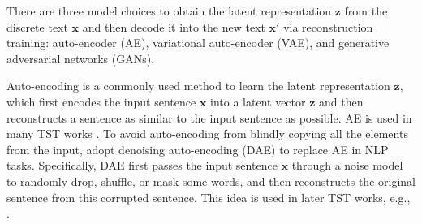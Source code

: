 \label{sec:enc_dec}
There are three model choices to obtain the latent representation $\bm{z}$ from the discrete text $\bm{x}$ and then decode it into the new text $\bm{x}'$ via reconstruction training: auto-encoder (AE), variational auto-encoder (VAE), and generative adversarial networks (GANs).

Auto-encoding  is a commonly used method to learn the latent representation $\bm{z}$, which first encodes the input sentence $\bm{x}$ into a latent vector $\bm{z}$ and then reconstructs a sentence as similar to the input sentence as possible.
AE is used in many TST works \cite[e.g.,][]{shen2017style,Hu2017TowardCG,fu2018style,Zhao2018AdversariallyRA,prabhumoye-etal-2018-style,yang2018unsupervised}. 
To avoid auto-encoding from blindly copying all the elements from the input,  adopt denoising auto-encoding (DAE)  to replace AE in NLP tasks. Specifically, DAE first passes the input sentence $\bm{x}$ through a noise model to randomly drop, shuffle, or mask some words, and then reconstructs the original sentence from this corrupted sentence. This idea is used in later TST works, e.g., . 

